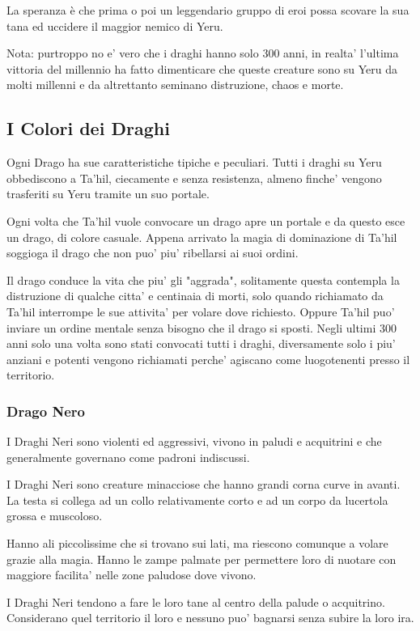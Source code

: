 \documentclass[a4paper,11pt,twoside,openany]{book}
\begin{document}
{La speranza è che prima o poi un leggendario gruppo di eroi possa scovare la sua tana ed uccidere il maggior nemico di Yeru.

Nota: purtroppo no e' vero che i draghi hanno solo 300 anni, in realta' l'ultima vittoria del millennio ha fatto dimenticare che queste creature sono su Yeru da molti millenni e da altrettanto seminano distruzione, chaos e morte.

\subsection{I Colori dei Draghi}

Ogni Drago ha sue caratteristiche tipiche e peculiari.
Tutti i draghi su Yeru obbediscono a Ta'hil, ciecamente e senza resistenza, almeno finche' vengono trasferiti su Yeru tramite un suo portale.

Ogni volta che Ta'hil vuole convocare un drago apre un portale e da questo esce un drago, di colore casuale. Appena arrivato la magia di dominazione di Ta'hil soggioga il drago che non puo' piu' ribellarsi ai suoi ordini.

Il drago conduce la vita che piu' gli "aggrada", solitamente questa contempla la distruzione di qualche citta' e centinaia di morti, solo quando richiamato da Ta'hil interrompe le sue attivita' per volare dove richiesto. Oppure Ta'hil puo' inviare un ordine mentale senza bisogno che il drago si sposti.
Negli ultimi 300 anni solo una volta sono stati convocati tutti i draghi, diversamente solo i piu' anziani e potenti vengono richiamati perche' agiscano come luogotenenti presso il territorio.

\subsubsection{Drago Nero} 

I Draghi Neri sono violenti ed aggressivi, vivono in paludi e acquitrini e che generalmente governano come padroni indiscussi.

I Draghi Neri sono creature minacciose che hanno grandi corna curve in avanti.
La testa si collega ad un collo relativamente corto e ad un corpo da lucertola grossa e muscoloso. 

Hanno ali piccolissime che si trovano sui lati, ma riescono comunque a volare grazie alla magia.
Hanno le zampe palmate per permettere loro di nuotare con maggiore facilita' nelle zone paludose dove vivono.

I Draghi Neri tendono a fare le loro tane al centro della palude o acquitrino.
Considerano quel territorio il loro e nessuno puo' bagnarsi senza subire la loro ira.

}
\end{document}
